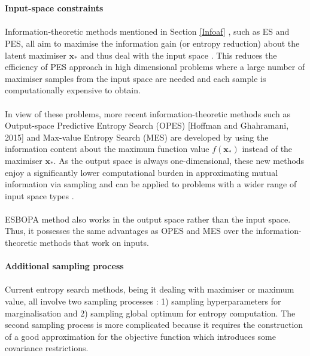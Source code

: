 \documentclass[a4paper,11pt]{report}
\begin{document}
 \\\\
\textbf{Input-space constraints} \label{input-spaceconstraints}
\\\\
Information-theoretic methods mentioned in Section \ref{Infoaf} , such as ES and PES, all aim to maximise the information gain (or entropy reduction) about the latent maximiser $\mathbf{x}_*$ and thus deal with the input space \cite{wang2017max}. This 
reduces the efficiency of PES approach in high dimensional problems where a large number of maximiser samples from the input space are needed \cite{wang2017max} and each sample is computationally expensive to obtain. 
\\\\ \noindent
In view of these problems, more recent information-theoretic methods such as Output-space Predictive Entropy Search (OPES) [Hoffman and Ghahramani, 2015] and Max-value Entropy Search (MES) \cite{wang2017max} are developed by using the information content about the maximum function value $f(\mathbf{x}_*)$ instead of the maximiser $\mathbf{x}_*$. As the output space is always one-dimensional, these new methods enjoy a significantly lower computational burden in approximating mutual information via sampling \cite{wang2017max} and can be applied to problems with a wider range of input space types \cite{Hoffman and Ghahramani, 2015}. 
\\\\ \noindent
ESBOPA method also works in the output space rather than the input space. Thus, it  possesses the same advantages as OPES and MES over the information-theoretic methods that work on inputs. 
\\\\
\textbf{Additional sampling process} \label{additionalsamplingprocess}
\\\\
Current entropy search methods, being it dealing with maximiser or maximum value, all involve two sampling processes : 1) sampling hyperparameters for marginalisation and 2) sampling global optimum for entropy computation. The second sampling process is more complicated because it requires the construction of a good approximation for the objective function\cite{hernandez2014predictive} which introduces some covariance restrictions. 
\end{document}
